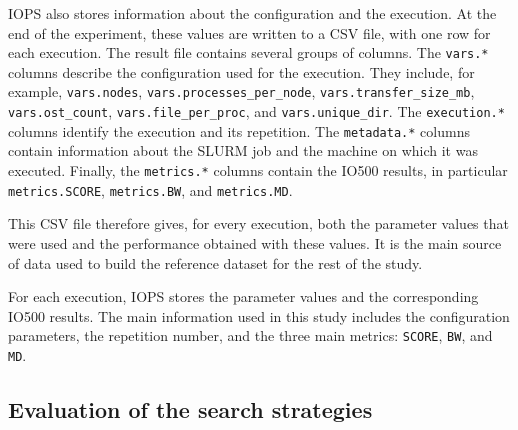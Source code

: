 IOPS also stores information about the configuration and the execution.
At the end of the experiment, these values are written to a CSV file,
with one row for each execution.
The result file contains several groups of columns. The
\texttt{vars.*} columns describe the configuration used for the
execution. They include, for example,
\texttt{vars.nodes},
\texttt{vars.processes\_per\_node},
\texttt{vars.transfer\_size\_mb},
\texttt{vars.ost\_count},
\texttt{vars.file\_per\_proc}, and
\texttt{vars.unique\_dir}.
The \texttt{execution.*} columns identify the execution and its
repetition. The \texttt{metadata.*} columns contain information about
the SLURM job and the machine on which it was executed. Finally, the
\texttt{metrics.*} columns contain the IO500 results, in particular
\texttt{metrics.SCORE}, \texttt{metrics.BW}, and
\texttt{metrics.MD}.

This CSV file therefore gives, for every execution, both the parameter
values that were used and the performance obtained with these values.
It is the main source of data used to build the reference dataset for the
rest of the study.

\begin{cut}
For each execution, IOPS stores the parameter values and the corresponding
IO500 results. The main information used in this study includes the
configuration parameters, the repetition number, and the three main
metrics: \texttt{SCORE}, \texttt{BW}, and \texttt{MD}.
\end{cut}




\subsection{Evaluation of the search strategies}
\label{sec:search-strategies}


